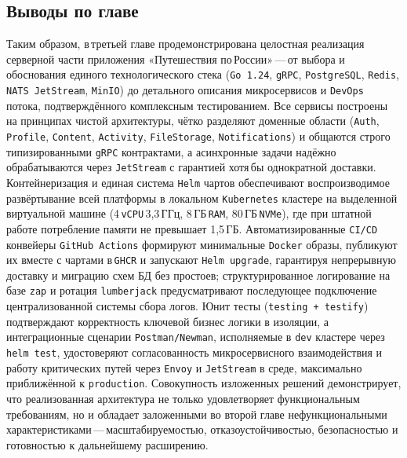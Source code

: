 \subsection*{Выводы по главе}
Таким образом, в третьей главе продемонстрирована целостная реализация серверной части приложения «Путешествия по России» — от выбора и обоснования единого технологического стека (\texttt{Go 1.24}, \texttt{gRPC}, \texttt{PostgreSQL}, \texttt{Redis}, \texttt{NATS JetStream}, \texttt{MinIO}) до детального описания микросервисов и \texttt{DevOps} потока, подтверждённого комплексным тестированием. Все сервисы построены на принципах чистой архитектуры, чётко разделяют доменные области (\texttt{Auth}, \texttt{Profile}, \texttt{Content}, \texttt{Activity}, \texttt{FileStorage}, \texttt{Notifications}) и общаются строго типизированными \texttt{gRPC} контрактами, а асинхронные задачи надёжно обрабатываются через \texttt{JetStream} с гарантией хотя бы однократной доставки. Контейнеризация и единая система \texttt{Helm} чартов обеспечивают воспроизводимое развёртывание всей платформы в локальном \texttt{Kubernetes} кластере на выделенной виртуальной машине (4 \texttt{vCPU} 3,3 ГГц, 8 ГБ \texttt{RAM}, 80 ГБ \texttt{NVMe}), где при штатной работе потребление памяти не превышает 1,5 ГБ. Автоматизированные \texttt{CI/CD} конвейеры \texttt{GitHub Actions} формируют минимальные \texttt{Docker} образы, публикуют их вместе с чартами в \texttt{GHCR} и запускают \texttt{Helm upgrade}, гарантируя непрерывную доставку и миграцию схем БД без простоев; структурированное логирование на базе \texttt{zap} и ротация \texttt{lumberjack} предусматривают последующее подключение централизованной системы сбора логов. Юнит тесты (\texttt{testing + testify}) подтверждают корректность ключевой бизнес логики в изоляции, а интеграционные сценарии \texttt{Postman/Newman}, исполняемые в \texttt{dev} кластере через \texttt{helm test}, удостоверяют согласованность микросервисного взаимодействия и работу критических путей через \texttt{Envoy} и \texttt{JetStream} в среде, максимально приближённой к \texttt{production}. Совокупность изложенных решений демонстрирует, что реализованная архитектура не только удовлетворяет функциональным требованиям, но и обладает заложенными во второй главе нефункциональными характеристиками — масштабируемостью, отказоустойчивостью, безопасностью и готовностью к дальнейшему расширению.
